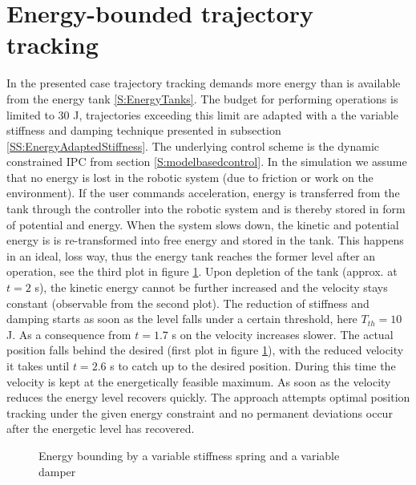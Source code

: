 \documentclass[a4paper,twoside, openright,12pt]{report}
\begin{document}
\section{Energy-bounded trajectory tracking}
In the presented case trajectory tracking demands more energy than is available from the energy tank \ref{S:EnergyTanks}. The budget for performing operations is limited to $30$ J, trajectories exceeding this limit are adapted with a the variable stiffness and damping technique presented in subsection \ref{SS:EnergyAdaptedStiffness}. The underlying control scheme is the dynamic constrained IPC from section \ref{S:modelbasedcontrol}. In the simulation we assume that no energy is lost in the robotic system (due to friction or work on the environment). If the user commands acceleration, energy is transferred from the tank through the controller into the robotic system and is thereby stored in form of potential and energy. When the system slows down, the kinetic and potential energy is is re-transformed into free energy and stored in the tank. This happens in an ideal, loss way, thus the energy tank reaches the former level after an operation, see the third plot in figure \ref{FIG:VarStiff}. Upon depletion of the tank (approx. at $t=2$ s), the kinetic energy cannot be further increased  and the velocity stays constant (observable from the second plot). The reduction of stiffness and damping starts as soon as the level falls under a certain threshold, here $T_{th}=10$ J. As a consequence from $t=1.7$ s on the velocity increases slower. The actual position falls behind the desired (first plot in figure \ref{FIG:VarStiff}), with the reduced velocity it takes until $t=2.6$ s to catch up to the desired position. During this time the velocity is kept at the energetically feasible maximum. As soon as the velocity reduces the energy level recovers quickly. The approach attempts optimal position tracking under the given energy constraint and no permanent deviations occur after the energetic level has recovered.
\begin{figure}

\label{FIG:VarStiff}
\caption[Simulation results of the energy bounding by a variable stiffness spring]{Energy bounding by a variable stiffness spring and a variable damper}
\end{figure}
%
%
\end{document}
